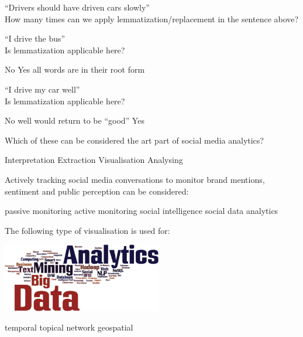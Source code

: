 \documentclass[theme=sleek, randomorder, hidesidemenu]{webquiz}
\begin{document}
\begin{question}
  ``Drivers should have driven cars slowly''\\
  How many times can we apply lemmatization/replacement in the sentence above?\\
\end{question}

\begin{question}
  ``I drive the bus''\\
  Is lemmatization applicable here?
  \begin{choice}
    \correct No
    \incorrect Yes \feedback all words are in their root form
  \end{choice}
\end{question}

\begin{question}
  ``I drive my car well''\\
  Is lemmatization applicable here?

  \begin{choice}
    \incorrect No \feedback well would return to be ``good''
    \correct Yes
  \end{choice}
\end{question}

\begin{question}
  Which of these can be considered the art part of social media analytics?
  \begin{choice}[columns=2]
    \correct Interpretation
    \incorrect Extraction
    \incorrect Visualisation
    \incorrect Analysing
  \end{choice}
\end{question}

\begin{question}
  Actively tracking social media conversations to monitor brand mentions, sentiment and public perception can be considered:
  \begin{choice}[columns=2]
    \incorrect passive monitoring
    \correct active monitoring
    \incorrect social intelligence
    \incorrect social data analytics
  \end{choice}
\end{question}

\begin{question}
  The following type of visualisation is used for:
  \begin{center}
    \includegraphics[height=30mm]{sma-quiz-1.png}
  \end{center}
  \begin{choice}
    \incorrect temporal
    \correct topical
    \incorrect network
    \incorrect geospatial
  \end{choice}
\end{question}
\end{document}
